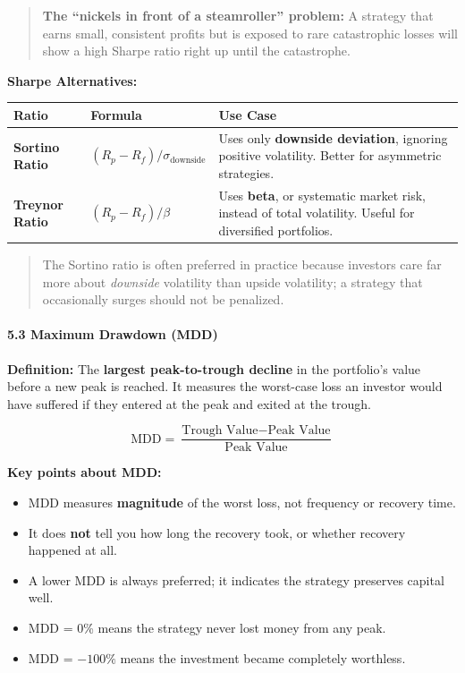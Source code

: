 \documentclass[12pt,openany]{book}
\begin{document}
\begin{quote}
    \textbf{The ``nickels in front of a steamroller'' problem:} A strategy that earns small, consistent profits but is exposed to rare catastrophic losses will show a high Sharpe ratio right up until the catastrophe.
\end{quote}

\textbf{Sharpe Alternatives:}

\begin{center}
\begin{tabular}{|L{0.18\textwidth}|L{0.28\textwidth}|L{0.44\textwidth}|}
\hline
\textbf{Ratio} & \textbf{Formula} & \textbf{Use Case} \\
\hline
\textbf{Sortino Ratio} & $(R_p - R_f) / \sigma_{\text{downside}}$ & Uses only \textbf{downside deviation}, ignoring positive volatility. Better for asymmetric strategies. \\
\hline
\textbf{Treynor Ratio} & $(R_p - R_f) / \beta$ & Uses \textbf{beta}, or systematic market risk, instead of total volatility. Useful for diversified portfolios. \\
\hline
\end{tabular}
\end{center}

\begin{quote}
    The Sortino ratio is often preferred in practice because investors care far more about \emph{downside} volatility than upside volatility; a strategy that occasionally surges should not be penalized.
\end{quote}

\paragraph{5.3 Maximum Drawdown (MDD)}

\textbf{Definition:} The \textbf{largest peak-to-trough decline} in the portfolio's value before a new peak is reached. It measures the worst-case loss an investor would have suffered if they entered at the peak and exited at the trough.

\begin{equation*}
    \text{MDD} = \frac{\text{Trough Value} - \text{Peak Value}}{\text{Peak Value}}
\end{equation*}

\textbf{Key points about MDD:}
\begin{itemize}[leftmargin=*]
    \item MDD measures \textbf{magnitude} of the worst loss, not frequency or recovery time.
    \item It does \textbf{not} tell you how long the recovery took, or whether recovery happened at all.
    \item A lower MDD is always preferred; it indicates the strategy preserves capital well.
    \item MDD = 0\% means the strategy never lost money from any peak.
    \item MDD = $-100\%$ means the investment became completely worthless.
\end{itemize}
\end{document}
